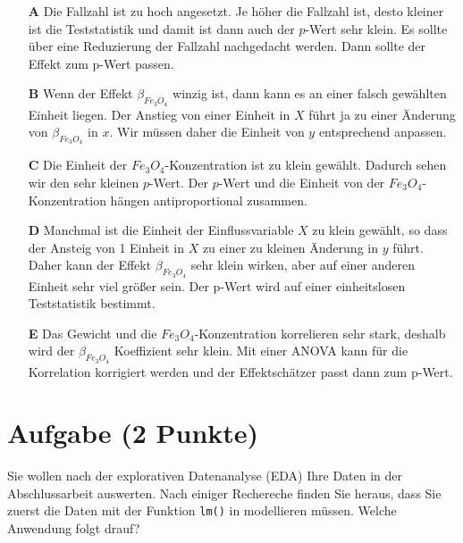 \documentclass[a4paper, 9pt]{scrartcl}\usepackage[]{graphicx}\usepackage[]{xcolor}
\begin{document}
\begin{enumerate}
\item [\textbf{A} \msquare] Die Fallzahl ist zu hoch angesetzt. Je höher die Fallzahl ist, desto kleiner ist die Teststatistik und damit ist dann auch der $p$-Wert sehr klein. Es sollte über eine Reduzierung der Fallzahl nachgedacht werden. Dann sollte der Effekt zum p-Wert passen.
\item [\textbf{B} \msquare] Wenn der Effekt $\beta_{Fe_3O_4}$ winzig ist, dann kann es an einer falsch gewählten Einheit liegen. Der Anstieg von einer Einheit in $X$ führt ja zu einer Änderung von $\beta_{Fe_3O_4}$ in $x$. Wir müssen daher die Einheit von $y$ entsprechend anpassen.
\item [\textbf{C} \msquare] Die Einheit der $Fe_3O_4$-Konzentration ist zu klein gewählt. Dadurch sehen wir den sehr kleinen $p$-Wert. Der $p$-Wert und die Einheit von der $Fe_3O_4$-Konzentration hängen antiproportional zusammen.
\item [\textbf{D} \msquare] Manchmal ist die Einheit der Einflussvariable $X$ zu klein gewählt, so dass der Ansteig von 1 Einheit in $X$ zu einer zu kleinen Änderung in $y$ führt. Daher kann der Effekt $\beta_{Fe_3O_4}$ sehr klein wirken, aber auf einer anderen Einheit sehr viel größer sein. Der p-Wert wird auf einer einheitslosen Teststatistik bestimmt.
\item [\textbf{E} \msquare] Das Gewicht und die $Fe_3O_4$-Konzentration korrelieren sehr stark, deshalb wird der $\beta_{Fe_3O_4}$ Koeffizient sehr klein. Mit einer ANOVA kann für die Korrelation korrigiert werden und der Effektschätzer passt dann zum p-Wert.
\end{enumerate}

\section{Aufgabe \hfill (2 Punkte)}



Sie wollen nach der explorativen Datenanalyse (EDA) Ihre Daten in der Abschlussarbeit auswerten. Nach einiger Rechereche finden Sie heraus, dass Sie zuerst die Daten mit der Funktion \texttt{lm()} in \Rlogo modellieren müssen. Welche Anwendung folgt drauf?
\end{document}
